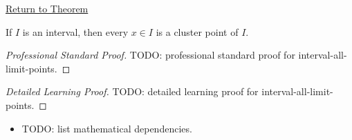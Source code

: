 \newpage
{}
\label{prf:interval-all-limit-points}

\begin{remark*}[Return]
\hyperref[cor:interval-all-limit-points]{Return to Theorem}
\end{remark*}

\begin{corollary*}
If $I$ is an interval, then every $x\in I$ is a cluster point of $I$.

\smallskip\noindent
\end{corollary*}

\begin{proof}[Professional Standard Proof]
\LRAProofBodyStart
TODO: professional standard proof for interval-all-limit-points.
\end{proof}

\begin{proof}[Detailed Learning Proof]
\LRAProofBodyStart
TODO: detailed learning proof for interval-all-limit-points.
\end{proof}

\begin{remark*}
\end{remark*}

\begin{dependencies}
\begin{itemize}
  \item TODO: list mathematical dependencies.
\end{itemize}
\end{dependencies}

\clearpage
